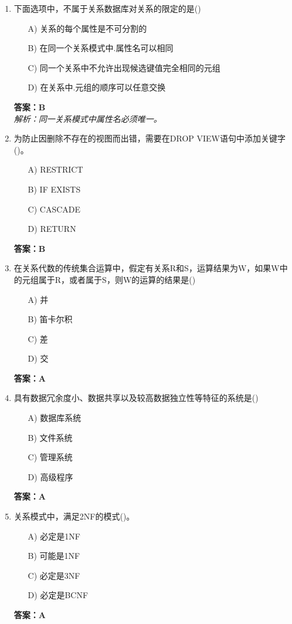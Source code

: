 \documentclass[a4paper,12pt]{article}
\begin{document}
\begin{enumerate}[label=\arabic*.]
\item 下面选项中，不属于关系数据库对关系的限定的是()
\begin{itemize}
    \item[A)] 关系的每个属性是不可分割的
    \item[B)] 在同一个关系模式中.属性名可以相同
    \item[C)] 同一个关系中不允许出现候选键值完全相同的元组
    \item[D)] 在关系中.元组的顺序可以任意交换
\end{itemize}
\textbf{答案：B} \\
\textit{解析：同一关系模式中属性名必须唯一。}

\item 为防止因删除不存在的视图而出错，需要在DROP VIEW语句中添加关键字()。
\begin{itemize}
    \item[A)] RESTRICT
    \item[B)] IF EXISTS
    \item[C)] CASCADE
    \item[D)] RETURN
\end{itemize}
\textbf{答案：B}

\item 在关系代数的传统集合运算中，假定有关系R和S，运算结果为W，如果W中的元组属于R，或者属于S，则W的运算的结果是()
\begin{itemize}
    \item[A)] 并
    \item[B)] 笛卡尔积
    \item[C)] 差
    \item[D)] 交
\end{itemize}
\textbf{答案：A}

\item 具有数据冗余度小、数据共享以及较高数据独立性等特征的系统是()
\begin{itemize}
    \item[A)] 数据库系统
    \item[B)] 文件系统
    \item[C)] 管理系统
    \item[D)] 高级程序
\end{itemize}
\textbf{答案：A}

\item 关系模式中，满足2NF的模式()。
\begin{itemize}
    \item[A)] 必定是1NF
    \item[B)] 可能是1NF
    \item[C)] 必定是3NF
    \item[D)] 必定是BCNF
\end{itemize}
\textbf{答案：A}


\end{enumerate}
\end{document}
